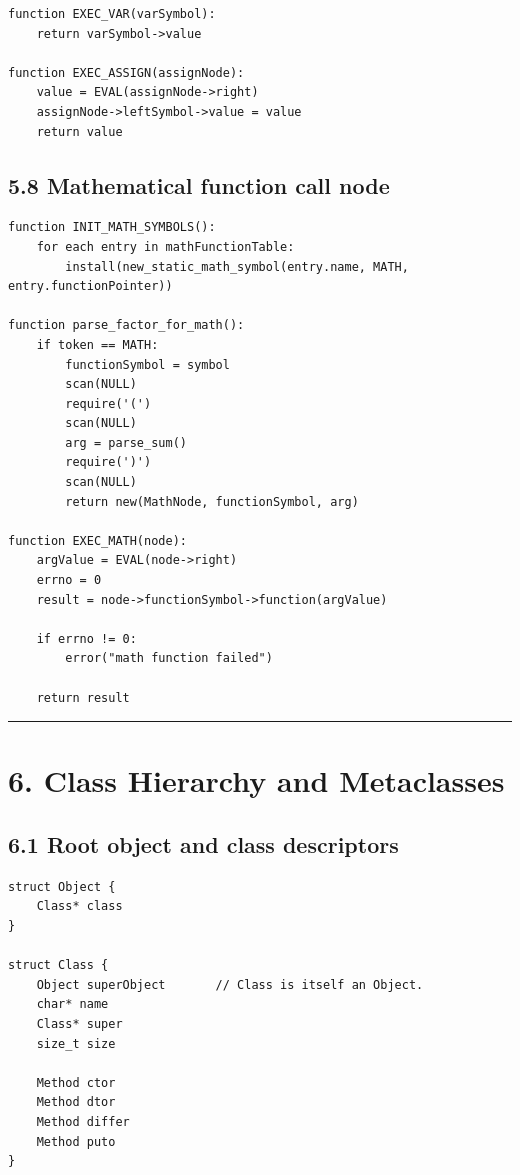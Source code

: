 \documentclass[11pt]{article}
\begin{document}
\begin{verbatim}
function EXEC_VAR(varSymbol):
    return varSymbol->value

function EXEC_ASSIGN(assignNode):
    value = EVAL(assignNode->right)
    assignNode->leftSymbol->value = value
    return value
\end{verbatim}

\subsection{5.8 Mathematical function call
node}\label{mathematical-function-call-node}

\begin{verbatim}
function INIT_MATH_SYMBOLS():
    for each entry in mathFunctionTable:
        install(new_static_math_symbol(entry.name, MATH, entry.functionPointer))

function parse_factor_for_math():
    if token == MATH:
        functionSymbol = symbol
        scan(NULL)
        require('(')
        scan(NULL)
        arg = parse_sum()
        require(')')
        scan(NULL)
        return new(MathNode, functionSymbol, arg)

function EXEC_MATH(node):
    argValue = EVAL(node->right)
    errno = 0
    result = node->functionSymbol->function(argValue)

    if errno != 0:
        error("math function failed")

    return result
\end{verbatim}

\begin{center}\rule{0.5\linewidth}{0.5pt}\end{center}

\section{6. Class Hierarchy and
Metaclasses}\label{class-hierarchy-and-metaclasses}

\subsection{6.1 Root object and class
descriptors}\label{root-object-and-class-descriptors}

\begin{verbatim}
struct Object {
    Class* class
}

struct Class {
    Object superObject       // Class is itself an Object.
    char* name
    Class* super
    size_t size

    Method ctor
    Method dtor
    Method differ
    Method puto
}
\end{verbatim}
\end{document}
